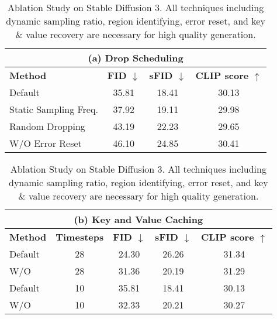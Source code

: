 \begin{table}[ht]
\centering

\begin{tabular}{lccc}
    \multicolumn{4}{c}{(a) Drop Scheduling} \\
    \hline
    \textbf{Method} & \textbf{FID $\downarrow$} & \textbf{sFID $\downarrow$} & \textbf{CLIP score $\uparrow$} \\
    \hline
    \rowcolor{gray!10}
    Default & 35.81 & 18.41 & 30.13 \\
    Static Sampling Freq. & 37.92 & 19.11 & 29.98 \\
    Random Dropping & 43.19 & 22.23 & 29.65 \\
    W/O Error Reset & 46.10 & 24.85 & 30.41 \\
    \hline
\end{tabular}


\vspace{1em}

\begin{tabular}{lcccc}
    \multicolumn{5}{c}{(b) Key and Value Caching} \\
    \hline
    \textbf{Method} & \textbf{Timesteps} & \textbf{FID $\downarrow$} & \textbf{sFID $\downarrow$} & \textbf{CLIP score $\uparrow$} \\
    \hline
    \rowcolor{gray!10}
    Default & 28 & 24.30 & 26.26 & 31.34 \\
    W/O & 28 & 31.36 & 20.19 & 31.29 \\
    \hline
    \rowcolor{gray!10}
    Default & 10 & 35.81 & 18.41 & 30.13 \\
    W/O & 10 & 32.33 & 20.21 & 30.27 \\
    \hline
\end{tabular}
\caption{Ablation Study on Stable Diffusion 3. All techniques including dynamic sampling ratio, region identifying, error reset, and key \& value recovery are necessary for high quality generation.}
\label{tab:ablation_combined}
\end{table}



